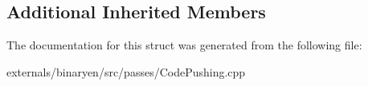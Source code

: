 \subsection*{Additional Inherited Members}


The documentation for this struct was generated from the following file\+:\begin{DoxyCompactItemize}
\item 
externals/binaryen/src/passes/Code\+Pushing.\+cpp\end{DoxyCompactItemize}
